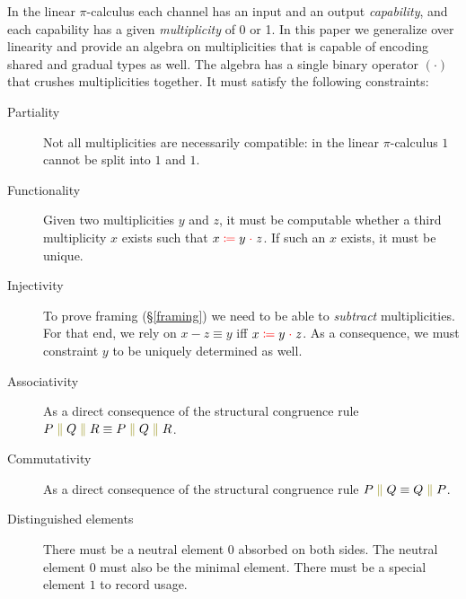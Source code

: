 \documentclass[a4paper,UKenglish,cleveref, autoref, thm-restate,authorcolumns]{lipics-v2019}
\theoremstyle{definition}
\newcommand{\picalc}{$\pi$-calculus}
\newcommand{\constr}[1]{\textcolor{olive}{\operatorname{#1}}}
\newcommand{\field}[1]{\textcolor{red}{\operatorname{#1}}}
\newcommand{\comp}[2]{#1 \; \constr{\parallel} \; #2}
\newcommand{\op}[3]{#1 \; \field{\coloneqq} \; #2 \; \field{\cdot} \; #3}
\begin{document}
In the linear \picalc{} each channel has an input and an output \emph{capability}, and each capability has a given \emph{multiplicity} of 0 or 1.
In this paper we generalize over linearity and provide an algebra on multiplicities that is capable of encoding shared and gradual types as well.
The algebra has a single binary operator $(\cdot)$ that crushes multiplicities together.
It must satisfy the following constraints:
\begin{description}

\item [Partiality]
  Not all multiplicities are necessarily compatible: in the linear \picalc{} $1$ cannot be split into $1$ and $1$.
\item [Functionality]
  Given two multiplicities $y$ and $z$, it must be computable whether a third multiplicity $x$ exists such that $\op{x}{y}{z}$.
  If such an $x$ exists, it must be unique.
    
\item [Injectivity]
  To prove framing (\S \ref{framing}) we need to be able to \emph{subtract} multiplicities.
  For that end, we rely on $x - z \equiv y$ iff $\op{x}{y}{z}$.
  As a consequence, we must constraint $y$ to be uniquely determined as well.

\item [Associativity]
  As a direct consequence of the structural congruence rule $\comp{P}{\comp{Q}{R}} \equiv \comp{\comp{P}{Q}}{R}$.

\item [Commutativity]
  As a direct consequence of the structural congruence rule $\comp{P}{Q} \equiv \comp{Q}{P}$.

\item [Distinguished elements]
  There must be a neutral element $0$ absorbed on both sides.
  The neutral element $0$ must also be the minimal element.
  There must be a special element $1$ to record usage.
\end{description}
\end{document}
